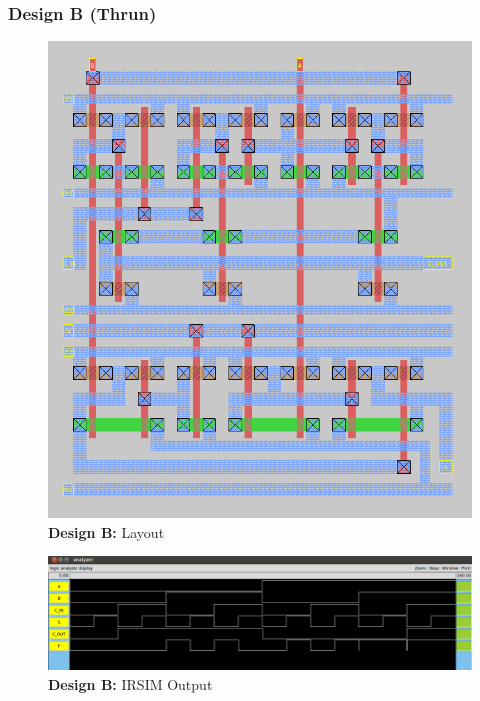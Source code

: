 \documentclass{article}
\begin{document}
\newpage
\subsubsection*{Design B (Thrun)}

\begin{figure}[H]
    \centering
    \includegraphics[width=\linewidth]{../part_3/max/max_layout.png}
    \caption{\textbf{Design B:} Layout}
\end{figure}

\newpage


\begin{figure}[H]
    \centering
    \includegraphics[width=\linewidth]{../part_3/max/max_irsim_glitch.png}
    \caption{\textbf{Design B:} IRSIM Output}
\end{figure}
\end{document}
